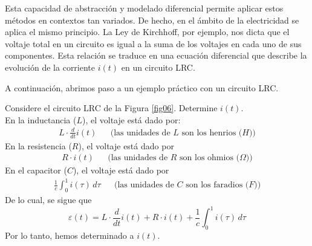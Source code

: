Esta capacidad de abstracción y modelado diferencial permite aplicar estos métodos en contextos tan variados. De hecho, en el ámbito de la electricidad se
aplica el mismo principio. La Ley de Kirchhoff, por ejemplo, nos dicta que el voltaje total en un circuito es igual a la suma de los voltajes en cada uno de sus componentes. Esta relación se traduce en una ecuación diferencial que describe la evolución de la corriente $i(t)$ en un circuito LRC.

A continuación, abrimos paso a un ejemplo práctico con un circuito LRC.

\begin{example}{}{}
    Considere el circuito LRC de la Figura \ref{fig06}. Determine $i(t)$. \\
    \solucion En la inductancia ($L$), el voltaje está dado por:
    \begin{align*}
        L \cdot \frac{d}{dt}i(t) && \text{(las unidades de $L$ son los henrios ($H$))}
    \end{align*}
    En la resistencia ($R$), el voltaje está dado por
    \begin{align*}
        R \cdot i(t) && \text{(las unidades de $R$ son los ohmios ($\Omega$))}
    \end{align*}
    En el capacitor ($C$), el voltaje está dado por
    \begin{align*}
        \frac{1}{c} \int_0^1 i(\tau) \, d\tau && \text{(las unidades de $C$ son los faradios ($F$))}
    \end{align*}
    De lo cual, se sigue que
    \begin{equation}
        \varepsilon(t) = L \cdot \frac{d}{dt}i(t) + R \cdot i(t) + \frac{1}{c} \int_0^1 i(\tau) \, d\tau
    \end{equation}
    Por lo tanto, hemos determinado a $i(t)$.
\end{example}

